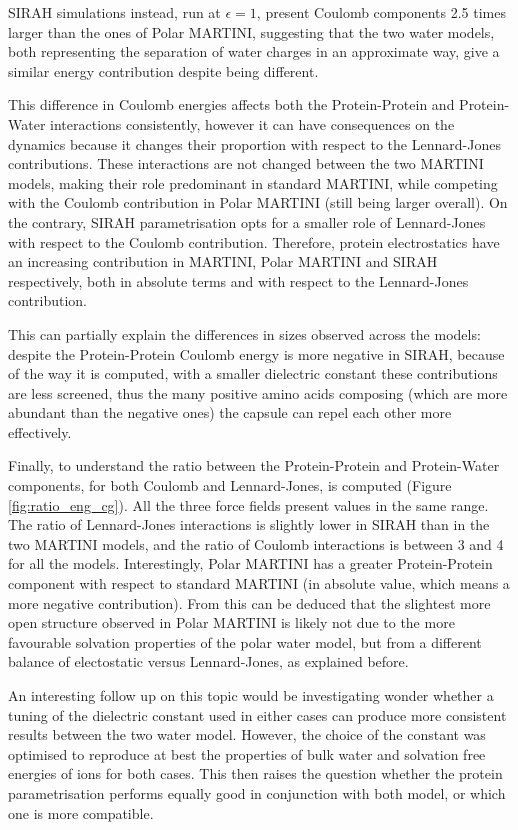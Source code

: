 SIRAH simulations instead, run at $\epsilon = 1$, present Coulomb components 2.5 times larger than the ones of Polar MARTINI, suggesting that the two water models, both representing the separation of water charges in an approximate way, give a similar energy contribution despite being different.

This difference in Coulomb energies affects both the Protein-Protein and Protein-Water interactions consistently, however it can have consequences on the dynamics because it changes their proportion with respect to the Lennard-Jones contributions. These interactions are not changed between the two MARTINI models, making their role predominant in standard MARTINI, while competing with the Coulomb contribution in Polar MARTINI (still being larger overall).
%
On the contrary, SIRAH parametrisation opts for a smaller role of Lennard-Jones with respect to the Coulomb contribution.
%
Therefore, protein electrostatics have an increasing contribution in MARTINI, Polar MARTINI and SIRAH respectively, both in absolute terms and with respect to the Lennard-Jones contribution.

This can partially explain the differences in sizes observed across the models: despite the Protein-Protein Coulomb energy is more negative in SIRAH, because of the way it is computed, with a smaller dielectric constant these contributions are less screened, thus the many positive amino acids composing (which are more abundant than the negative ones) the capsule can repel each other more effectively.

Finally, to understand the ratio between the Protein-Protein and Protein-Water components, for both Coulomb and Lennard-Jones, is computed (Figure \ref{fig:ratio_eng_cg}).
%
All the three force fields present values in the same range.
%
The ratio of Lennard-Jones interactions is slightly lower in SIRAH than in the two MARTINI models, and the ratio of Coulomb interactions is between 3 and 4 for all the models.
%
Interestingly, Polar MARTINI has a greater Protein-Protein component with respect to standard MARTINI (in absolute value, which means a more negative contribution). From this can be deduced that the slightest more open structure observed in Polar MARTINI is likely not due to the more favourable solvation properties of the polar water model, but from a different balance of electostatic versus Lennard-Jones, as explained before.
 
An interesting follow up on this topic would be investigating wonder whether a tuning of the dielectric constant used in either cases can produce more consistent results between the two water model. However, the choice of the constant was optimised to reproduce at best the properties of bulk water and solvation free energies of ions for both cases. This then raises the question whether the protein parametrisation performs equally good in conjunction with both model, or which one is more compatible.



